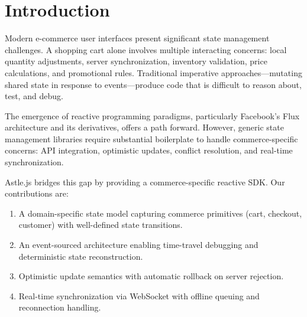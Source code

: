 \section{Introduction}


Modern e-commerce user interfaces present significant state management challenges. A shopping cart alone involves multiple interacting concerns: local quantity adjustments, server synchronization, inventory validation, price calculations, and promotional rules. Traditional imperative approaches—mutating shared state in response to events—produce code that is difficult to reason about, test, and debug.

The emergence of reactive programming paradigms, particularly Facebook's Flux architecture \cite{flux2014} and its derivatives, offers a path forward. However, generic state management libraries require substantial boilerplate to handle commerce-specific concerns: API integration, optimistic updates, conflict resolution, and real-time synchronization.

Astle.js bridges this gap by providing a commerce-specific reactive SDK. Our contributions are:

\begin{enumerate}
\item A domain-specific state model capturing commerce primitives (cart, checkout, customer) with well-defined state transitions.
\item An event-sourced architecture enabling time-travel debugging and deterministic state reconstruction.
\item Optimistic update semantics with automatic rollback on server rejection.
\item Real-time synchronization via WebSocket with offline queuing and reconnection handling.
\end{enumerate}

